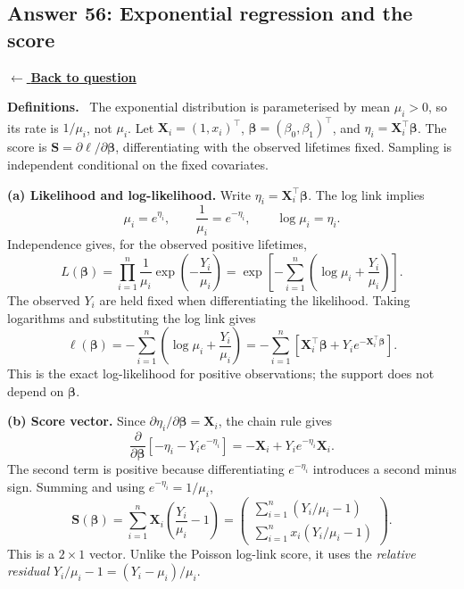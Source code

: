 \documentclass[11pt,a4paper]{article}
\newcommand{\answernav}[1]{%
  \label{answer:#1}%
  \noindent\hyperref[question:#1]{$\leftarrow$ \textbf{Back to question}}%
  \par\smallskip}
\newcommand{\studyheading}[1]{%
  \par\medskip\noindent\textcolor{statblue}{\textbf{#1.}}\ }
\begin{document}
\clearpage

\subsection{Answer 56: Exponential regression and the score}
\answernav{56}

\studyheading{Definitions}
The exponential distribution is parameterised by mean $\mu_i>0$, so its rate is $1/\mu_i$, not $\mu_i$.
Let $\mathbf X_i=(1,x_i)^\top$, $\boldsymbol\beta=(\beta_0,\beta_1)^\top$, and $\eta_i=\mathbf X_i^\top\boldsymbol\beta$.
The score is $\mathbf S=\partial\ell/\partial\boldsymbol\beta$, differentiating with the observed lifetimes fixed.
Sampling is independent conditional on the fixed covariates.

\textbf{(a) Likelihood and log-likelihood.}
Write $\eta_i=\mathbf X_i^\top\boldsymbol\beta$. The log link implies
\[
\mu_i=e^{\eta_i},\qquad\frac1{\mu_i}=e^{-\eta_i},
\qquad\log\mu_i=\eta_i.
\]
Independence gives, for the observed positive lifetimes,
\[
L(\boldsymbol\beta)
=\prod_{i=1}^n\frac1{\mu_i}\exp\left(-\frac{Y_i}{\mu_i}\right)
=\exp\left[-\sum_{i=1}^n\left(\log\mu_i+\frac{Y_i}{\mu_i}\right)\right].
\]
The observed $Y_i$ are held fixed when differentiating the likelihood.
Taking logarithms and substituting the log link gives
\[
\boxed{
\ell(\boldsymbol\beta)
=-\sum_{i=1}^n\left(\log\mu_i+\frac{Y_i}{\mu_i}\right)
=-\sum_{i=1}^n\left[
\mathbf X_i^\top\boldsymbol\beta
+Y_i e^{-\mathbf X_i^\top\boldsymbol\beta}\right].
}
\]
This is the exact log-likelihood for positive observations; the support
does not depend on $\boldsymbol\beta$.

\textbf{(b) Score vector.}
Since $\partial\eta_i/\partial\boldsymbol\beta=\mathbf X_i$, the chain
rule gives
\[
\frac{\partial}{\partial\boldsymbol\beta}
\left[-\eta_i-Y_i e^{-\eta_i}\right]
=-\mathbf X_i+Y_i e^{-\eta_i}\mathbf X_i.
\]
The second term is positive because differentiating $e^{-\eta_i}$
introduces a second minus sign. Summing and using $e^{-\eta_i}=1/\mu_i$,
\[
\boxed{
\mathbf S(\boldsymbol\beta)
=\sum_{i=1}^n\mathbf X_i\left(\frac{Y_i}{\mu_i}-1\right)
=\begin{pmatrix}
\sum_{i=1}^n(Y_i/\mu_i-1)\\[3pt]
\sum_{i=1}^n x_i(Y_i/\mu_i-1)
\end{pmatrix}.
}
\]
This is a $2\times1$ vector. Unlike the Poisson log-link score, it uses
the \emph{relative residual} $Y_i/\mu_i-1=(Y_i-\mu_i)/\mu_i$.
\end{document}
